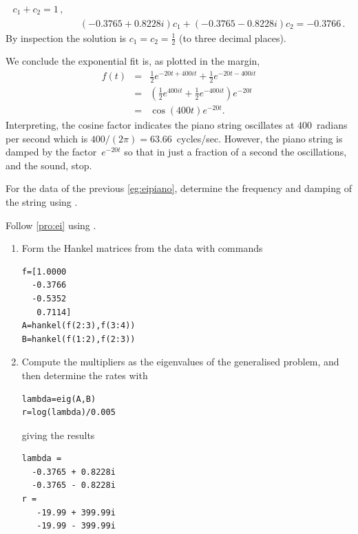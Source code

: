 \begin{draft}
\begin{example}
\begin{solution}
\begin{enumerate}
\begin{eqnarray*}
c_1+c_2=1\,, 
\\&&
(-0.3765 + 0.8228i)c_1+(-0.3765 - 0.8228i)c_2=-0.3766\,.
\end{eqnarray*}
By inspection the solution is \(c_1=c_2=\tfrac12\) (to three decimal places).
\end{enumerate}
%
We conclude the exponential fit is, as plotted in the margin,
\begin{eqnarray*}
f(t)&=&\tfrac12e^{-20t+400it}+\tfrac12e^{-20t-400it}
\\&=&\left(\tfrac12e^{400it}+\tfrac12e^{-400it}\right)e^{-20t}
\\&=&\cos(400t)e^{-20t}.
\end{eqnarray*}
Interpreting, the cosine factor indicates the piano string oscillates at \(400\)~radians per second which is \(400/(2\pi)=63.66\)~cycles/sec.
%
However, the piano string is damped by the factor~\(e^{-20t}\) so that in just a fraction of a second the oscillations, and the sound, stop.
\end{solution}
\end{example}




\begin{example} \label{eg:eipianu}
For the data of the previous \autoref{eg:eipiano}, determine the frequency and damping of the string using \script.

\begin{solution} 
Follow \autoref{pro:ei} using \script. 
\begin{enumerate}
\item Form the Hankel matrices from the data with commands
\begin{verbatim}
f=[1.0000
  -0.3766
  -0.5352
   0.7114]
A=hankel(f(2:3),f(3:4))
B=hankel(f(1:2),f(2:3))
\end{verbatim}
\setbox\ajrqrbox\hbox{}%
\marginpar{\usebox{\ajrqrbox}}%

\item Compute the multipliers as the eigenvalues of the generalised problem, and then determine the rates with
\begin{verbatim}
lambda=eig(A,B)
r=log(lambda)/0.005
\end{verbatim}
giving the results
\begin{verbatim}
lambda =
  -0.3765 + 0.8228i
  -0.3765 - 0.8228i
r =
   -19.99 + 399.99i
   -19.99 - 399.99i
\end{verbatim}



\end{enumerate}
\end{solution}
\end{example}
\end{draft}
